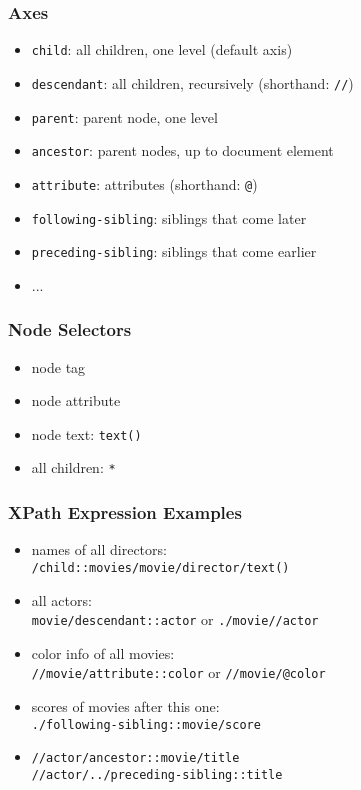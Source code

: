 \documentclass[dvipsnames]{beamer}
\theoremstyle{plain}
\begin{document}
\begin{frame}
  \frametitle{Axes}

  \begin{itemize}
    \item \lstinline!child!:
      all children, one level (default axis)
    \item \lstinline!descendant!:
      all children, recursively (shorthand: \lstinline!//!)
    \item \lstinline!parent!:
      parent node, one level
    \item \lstinline!ancestor!:
      parent nodes, up to document element
    \item \lstinline!attribute!:
      attributes (shorthand: \lstinline!@!)
    \item \lstinline!following-sibling!:
      siblings that come later
    \item \lstinline!preceding-sibling!:
      siblings that come earlier
    \item ...
  \end{itemize}
\end{frame}

\begin{frame}
  \frametitle{Node Selectors}

  \begin{itemize}
    \item node tag
    \item node attribute
    \item node text: \lstinline!text()!
    \item all children: \lstinline!*!
  \end{itemize}
\end{frame}

\begin{frame}
  \frametitle{XPath Expression Examples}

  \begin{example}
    \begin{itemize}
      \item names of all directors:\\
        \lstinline!/child::movies/movie/director/text()!

      \pause
      \item all actors:\\
        \lstinline!movie/descendant::actor! or \lstinline!./movie//actor!

      \pause
      \item color info of all movies:\\
        \lstinline!//movie/attribute::color! or \lstinline!//movie/@color!

      \pause
      \item scores of movies after this one:\\
        \lstinline!./following-sibling::movie/score!

      \pause
      \item \lstinline!//actor/ancestor::movie/title!\\
        \lstinline!//actor/../preceding-sibling::title!
    \end{itemize}
  \end{example}
\end{frame}
\end{document}
